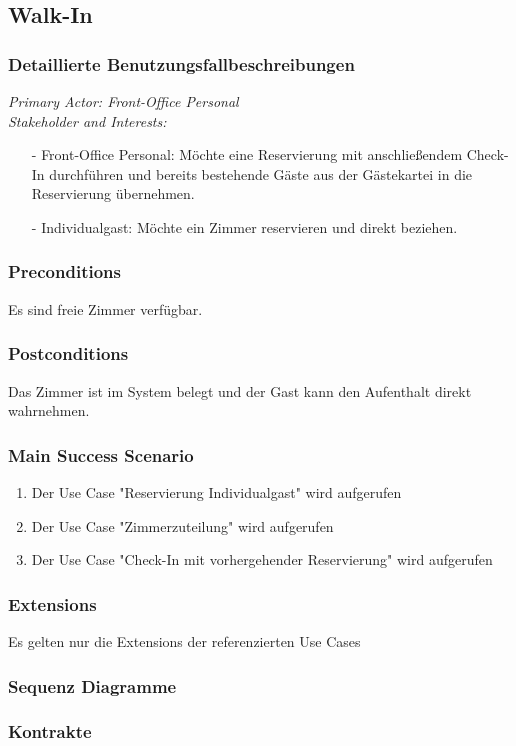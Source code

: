 \documentclass[./detailed_overview_usecases.tex]{subfiles}
\begin{document}
    \subsection{Walk-In}
    \subsubsection{Detaillierte Benutzungsfallbeschreibungen}

    \textit{Primary Actor: Front-Office Personal}
    \\
    \textit{Stakeholder and Interests:}
    \begin{itemize}
        \item[-] Front-Office Personal: Möchte eine Reservierung mit anschließendem Check-In durchführen und bereits bestehende Gäste aus der Gästekartei in die Reservierung übernehmen.
        \item[-] Individualgast: Möchte ein Zimmer reservieren und direkt beziehen.
    \end{itemize}

    \subsubsection*{Preconditions}
    Es sind freie Zimmer verfügbar.

    \subsubsection*{Postconditions}
    Das Zimmer ist im System belegt und der Gast kann den Aufenthalt direkt wahrnehmen.

    \subsubsection*{Main Success Scenario}
    \begin{enumerate}
        \item Der Use Case "Reservierung Individualgast" wird aufgerufen
        \item Der Use Case "Zimmerzuteilung" wird aufgerufen
        \item Der Use Case "Check-In mit vorhergehender Reservierung" wird aufgerufen
    \end{enumerate}

    \subsubsection*{Extensions}
    Es gelten nur die Extensions der referenzierten Use Cases

    \subsubsection{Sequenz Diagramme}
    \subsubsection{Kontrakte}
\end{document}
